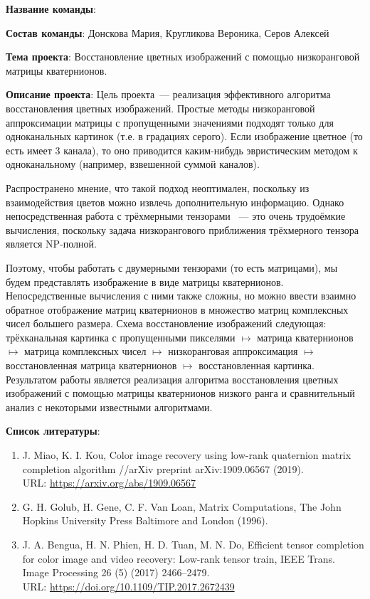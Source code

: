 \documentclass[12pt]{article}
\begin{document}
\textbf{Название команды}:


\textbf{Состав команды}:
Донскова Мария, Кругликова Вероника, Серов Алексей


\textbf{Тема проекта}:
Восстановление цветных изображений с помощью низкоранговой  матрицы кватернионов.


\textbf{Описание проекта}:
Цель проекта~--- реализация эффективного алгоритма восстановления цветных изображений.
Простые методы низкоранговой аппроксимации матрицы с пропущенными значениями подходят только для одноканальных картинок (т.е. в градациях серого).
Если изображение цветное (то есть имеет 3 канала), то оно приводится каким-нибудь эвристическим методом к одноканальному (например, взвешенной суммой каналов).

Распространено мнение, что такой подход неоптимален, поскольку из взаимодействия цветов можно извлечь дополнительную информацию.
Однако непосредственная работа с трёхмерными тензорами ~--- это очень трудоёмкие вычисления, поскольку задача низкорангового приближения трёхмерного тензора является NP-полной.

Поэтому, чтобы работать с двумерными тензорами (то есть матрицами), мы будем представлять изображение в виде матрицы кватернионов.
Непосредственные вычисления с ними также сложны, но можно ввести взаимно обратное отображение матриц кватернионов в множество матриц комплексных чисел большего размера.
Схема восстановление изображений следующая: трёхканальная картинка с пропущенными пикселями $\mapsto$ матрица кватернионов $\mapsto$ матрица комплексных чисел $\mapsto$ низкоранговая аппроксимация $\mapsto$ восстановленная матрица кватернионов $\mapsto$ восстановленная картинка.  Результатом работы является реализация алгоритма восстановления цветных изображений с помощью матрицы кватернионов низкого ранга и сравнительный анализ с некоторыми известными алгоритмами.


\textbf{Список литературы}:
    \begin{enumerate}[label=\arabic*)]
	\item
	J. Miao, K. I. Kou, Color image recovery using low-rank quaternion matrix completion algorithm //arXiv preprint arXiv:1909.06567 (2019).\\
	URL:  \href{https://arxiv.org/abs/1909.06567}{https://arxiv.org/abs/1909.06567}

	\item
G. H. Golub, H. Gene, C. F. Van Loan,  Matrix Computations, The John Hopkins University Press Baltimore and London (1996).

	\item
	J. A. Bengua, H. N. Phien, H. D. Tuan, M. N. Do, Efficient tensor completion for color image and video recovery: Low-rank tensor train, IEEE Trans. Image Processing 26 (5) (2017) 2466–2479. \\
	URL:  \href{https://doi.org/10.1109/TIP.2017.2672439}{https://doi.org/10.1109/TIP.2017.2672439}
    \end{enumerate}
\end{document}
